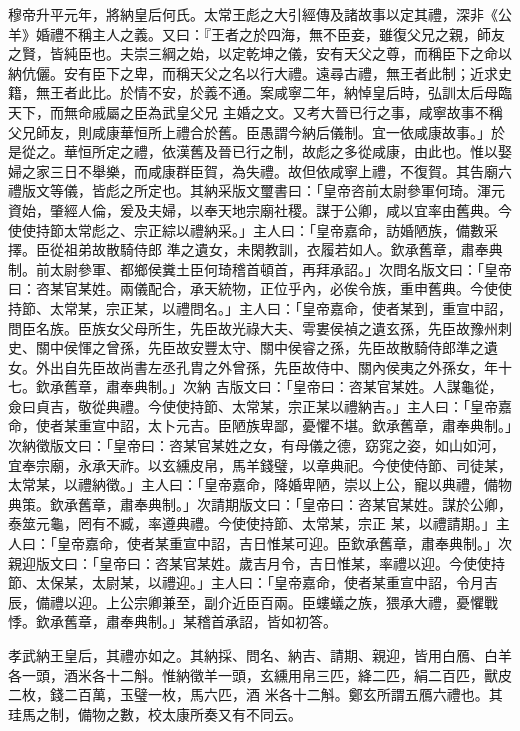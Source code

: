 \begin{pinyinscope}
 穆帝升平元年，將納皇后何氏。太常王彪之大引經傳及諸故事以定其禮，深非《公羊》婚禮不稱主人之義。又曰：『王者之於四海，無不臣妾，雖復父兄之親，師友之賢，皆純臣也。夫崇三綱之始，以定乾坤之儀，安有天父之尊，而稱臣下之命以納伉儷。安有臣下之卑，而稱天父之名以行大禮。遠尋古禮，無王者此制；近求史籍，無王者此比。於情不安，於義不通。案咸寧二年，納悼皇后時，弘訓太后母臨天下，而無命戚屬之臣為武皇父兄
 主婚之文。又考大晉已行之事，咸寧故事不稱父兄師友，則咸康華恒所上禮合於舊。臣愚謂今納后儀制。宜一依咸康故事。」於是從之。華恒所定之禮，依漢舊及晉已行之制，故彪之多從咸康，由此也。惟以娶婦之家三日不舉樂，而咸康群臣賀，為失禮。故但依咸寧上禮，不復賀。其告廟六禮版文等儀，皆彪之所定也。其納采版文璽書曰：「皇帝咨前太尉參軍何琦。渾元資始，肇經人倫，爰及夫婦，以奉天地宗廟社稷。謀于公卿，咸以宜率由舊典。今使使持節太常彪之、宗正綜以禮納采。」主人曰：「皇帝嘉命，訪婚陋族，備數采擇。臣從祖弟故散騎侍郎
 準之遺女，未閑教訓，衣履若如人。欽承舊章，肅奉典制。前太尉參軍、都鄉侯糞土臣何琦稽首頓首，再拜承詔。」次問名版文曰：「皇帝曰：咨某官某姓。兩儀配合，承天統物，正位乎內，必俟令族，重申舊典。今使使持節、太常某，宗正某，以禮問名。」主人曰：「皇帝嘉命，使者某到，重宣中詔，問臣名族。臣族女父母所生，先臣故光祿大夫、雩婁侯禎之遺玄孫，先臣故豫州刺史、關中侯惲之曾孫，先臣故安豐太守、關中侯睿之孫，先臣故散騎侍郎準之遺女。外出自先臣故尚書左丞孔胄之外曾孫，先臣故侍中、關內侯夷之外孫女，年十七。欽承舊章，肅奉典制。」次納
 吉版文曰：「皇帝曰：咨某官某姓。人謀龜從，僉曰貞吉，敬從典禮。今使使持節、太常某，宗正某以禮納吉。」主人曰：「皇帝嘉命，使者某重宣中詔，太卜元吉。臣陋族卑鄙，憂懼不堪。欽承舊章，肅奉典制。」次納徵版文曰：「皇帝曰：咨某官某姓之女，有母儀之德，窈窕之姿，如山如河，宜奉宗廟，永承天祚。以玄纁皮帛，馬羊錢璧，以章典祀。今使使侍節、司徒某，太常某，以禮納徵。」主人曰：「皇帝嘉命，降婚卑陋，崇以上公，寵以典禮，備物典策。欽承舊章，肅奉典制。」次請期版文曰：「皇帝曰：咨某官某姓。謀於公卿，泰筮元龜，罔有不臧，率遵典禮。今使使持節、太常某，宗正
 某，以禮請期。」主人曰：「皇帝嘉命，使者某重宣中詔，吉日惟某可迎。臣欽承舊章，肅奉典制。」次親迎版文曰：「皇帝曰：咨某官某姓。歲吉月令，吉日惟某，率禮以迎。今使使持節、太保某，太尉某，以禮迎。」主人曰：「皇帝嘉命，使者某重宣中詔，令月吉辰，備禮以迎。上公宗卿兼至，副介近臣百兩。臣螻蟻之族，猥承大禮，憂懼戰悸。欽承舊章，肅奉典制。」某稽首承詔，皆如初答。



 孝武納王皇后，其禮亦如之。其納採、問名、納吉、請期、親迎，皆用白鴈、白羊各一頭，酒米各十二斛。惟納徵羊一頭，玄纁用帛三匹，絳二匹，絹二百匹，獸皮二枚，錢二百萬，玉璧一枚，馬六匹，酒
 米各十二斛。鄭玄所謂五鴈六禮也。其珪馬之制，備物之數，校太康所奏又有不同云。




\end{pinyinscope}
